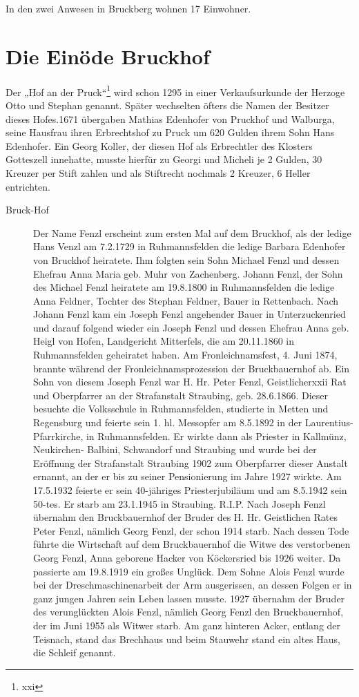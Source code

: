 \documentclass{book}
\begin{document}
In den zwei Anwesen in Bruckberg wohnen 17 Einwohner.

\section{Die Einöde Bruckhof}

Der „Hof an der Pruck“\footnote{xxi} wird schon 1295 in einer
Verkaufsurkunde der Herzoge Otto und Stephan genannt. Später wechselten
öfters die Namen der Besitzer dieses Hofes.1671 übergaben Mathias
Edenhofer von Pruckhof und Walburga, seine Hausfrau ihren Erbrechtshof
zu Pruck um 620 Gulden ihrem Sohn Hans Edenhofer. Ein Georg Koller, der
diesen Hof als Erbrechtler des Klosters Gotteszell innehatte, musste
hierfür zu Georgi und Micheli je 2 Gulden, 30 Kreuzer per Stift zahlen
und als Stiftrecht nochmals 2 Kreuzer, 6 Heller entrichten.

\begin{description}
\item[Bruck-Hof] Der Name Fenzl erscheint zum ersten Mal auf dem
Bruckhof, als der ledige Hans Venzl am 7.2.1729 in Ruhmannsfelden die
ledige Barbara Edenhofer von Bruckhof heiratete. Ihm folgten sein Sohn
Michael Fenzl und dessen Ehefrau Anna Maria geb. Muhr von Zachenberg.
Johann Fenzl, der Sohn des Michael Fenzl heiratete am 19.8.1800 in
Ruhmannsfelden die ledige Anna Feldner, Tochter des Stephan Feldner,
Bauer in Rettenbach. Nach Johann Fenzl kam ein Joseph Fenzl angehender
Bauer in Unterzuckenried und darauf folgend wieder ein Joseph Fenzl und
dessen Ehefrau Anna geb. Heigl von Hofen, Landgericht Mitterfels, die am
20.11.1860 in Ruhmannsfelden geheiratet haben. Am Fronleichnamsfest, 4.
Juni 1874, brannte während der Fronleichnamsprozession der
Bruckbauernhof ab. Ein Sohn von diesem Joseph Fenzl war H. Hr. Peter
Fenzl, Geistlicherxxii Rat und Oberpfarrer an der Strafanstalt
Straubing, geb. 28.6.1866. Dieser besuchte die Volksschule in
Ruhmannsfelden, studierte in Metten und Regensburg und feierte sein 1.
hl. Messopfer am 8.5.1892 in der Laurentius-Pfarrkirche, in
Ruhmannsfelden. Er wirkte dann als Priester in Kallmünz, Neukirchen-
Balbini, Schwandorf und Straubing und wurde bei der Eröffnung der
Strafanstalt Straubing 1902 zum Oberpfarrer dieser Anstalt ernannt, an
der er bis zu seiner Pensionierung im Jahre 1927 wirkte. Am 17.5.1932
feierte er sein 40-jähriges Priesterjubiläum und am 8.5.1942 sein
50-tes. Er starb am 23.1.1945 in Straubing. R.I.P. Nach Joseph Fenzl
übernahm den Bruckbauernhof der Bruder des H. Hr. Geistlichen Rates
Peter Fenzl, nämlich Georg Fenzl, der schon 1914 starb. Nach dessen Tode
führte die Wirtschaft auf dem Bruckbauernhof die Witwe des verstorbenen
Georg Fenzl, Anna geborene Hacker von Köckersried bis 1926 weiter. Da
passierte am 19.8.1919 ein großes Unglück. Dem Sohne Alois Fenzl wurde
bei der Dreschmaschinenarbeit der Arm ausgerissen, an dessen Folgen er
in ganz jungen Jahren sein Leben lassen musste. 1927 übernahm der Bruder
des verunglückten Alois Fenzl, nämlich Georg Fenzl den Bruckbauernhof,
der im Juni 1955 als Witwer starb. Am ganz hinteren Acker, entlang der
Teisnach, stand das Brechhaus und beim Stauwehr stand ein altes Haus,
die Schleif genannt.
\end{description}
\end{document}
